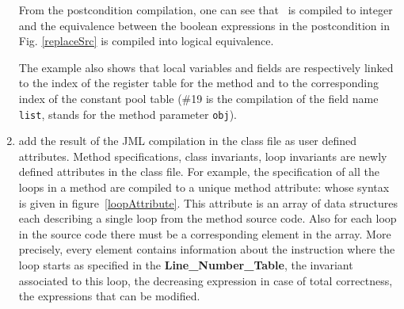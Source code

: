 \begin{enumerate}
From the postcondition compilation, one can see that \result \ is compiled to integer and the equivalence between the boolean expressions in the postcondition in Fig. \ref{replaceSrc}  is compiled into logical equivalence.

The example also shows that local variables and  fields are respectively linked to the index of the register table for the method and to the corresponding index of the constant pool table (\#19 is the compilation of the field name \texttt{list},  stands for the method parameter \texttt{obj}). 


\item add the result of the JML compilation in the class file as user defined attributes. Method specifications, class invariants, loop invariants are 
newly defined attributes in the class file.
 For example, the specification of all the loops in a method are compiled to a unique method attribute: whose syntax is given in figure~\ref{loopAttribute}. This attribute is an array of data structures each describing a single loop from the method source code. Also for each loop in the source code there must be a corresponding element in the array. 
More precisely, every element contains information about the instruction where the loop starts as specified in the
\textbf{Line\_Number\_Table}, the invariant associated to this loop, the decreasing expression in case of total correctness, the expressions that can be modified. 
\end{enumerate}

